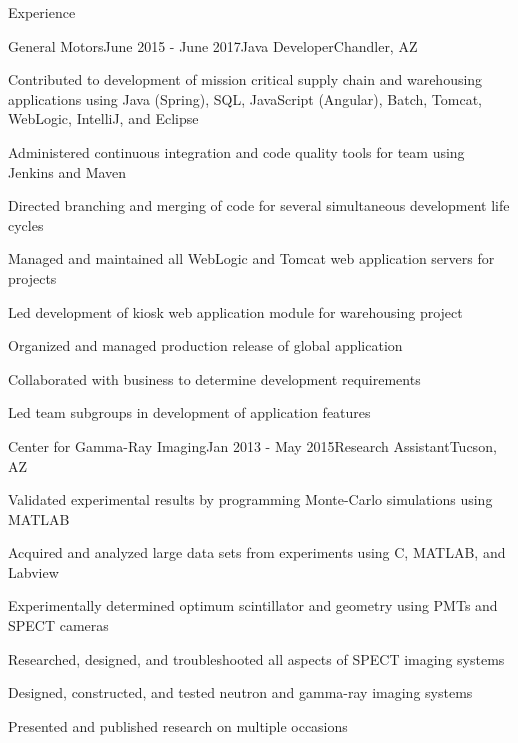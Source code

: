 \documentclass{resume} %
\begin{document}

\begin{rSection}{Experience}

\begin{rSubsection}{General Motors}{June 2015 - June 2017}{Java Developer}{Chandler, AZ}

\setlength{\itemindent}{.0in}\item 
Contributed to development of mission critical supply chain and warehousing applications using
\newline
Java (Spring), SQL, JavaScript (Angular), Batch, Tomcat, WebLogic, IntelliJ, and Eclipse
\setlength{\itemindent}{.0in}\item
Administered continuous integration and code quality tools for team using Jenkins and Maven
\setlength{\itemindent}{.0in}\item
Directed branching and merging of code for several simultaneous development life cycles
\setlength{\itemindent}{.0in}\item
Managed and maintained all WebLogic and Tomcat web application servers for projects
\setlength{\itemindent}{.0in}\item
Led development of kiosk web application module for warehousing project
\setlength{\itemindent}{.0in}\item
Organized and managed production release of global application
\setlength{\itemindent}{.0in}\item
Collaborated with business to determine development requirements
\setlength{\itemindent}{.0in}\item
Led team subgroups in development of application features

\end{rSubsection}


\begin{rSubsection}{Center for Gamma-Ray Imaging}{Jan 2013 - May 2015}{Research Assistant}{Tucson, AZ}
\item Validated experimental results by programming Monte-Carlo simulations using MATLAB
\item Acquired and analyzed large data sets from experiments using C, MATLAB, and Labview 
\item Experimentally determined optimum scintillator and geometry using PMTs and SPECT cameras
\item Researched, designed, and troubleshooted all aspects of SPECT imaging systems
\item Designed, constructed, and tested neutron and gamma-ray imaging systems
\item Presented and published research on multiple occasions

\end{rSubsection}

\end{rSection}
\end{document}
